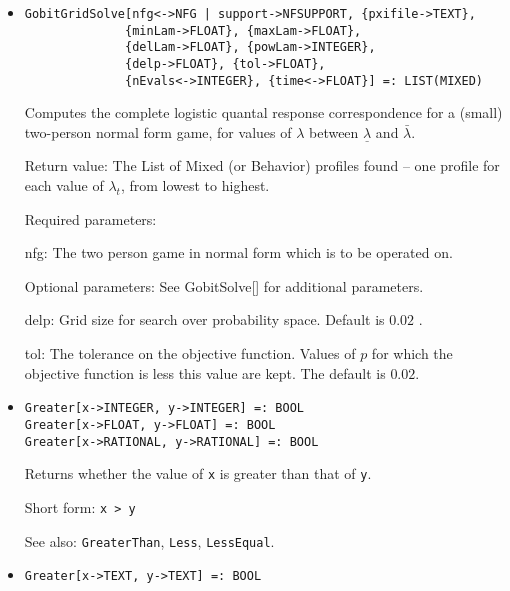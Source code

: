 \begin{itemize}
\item
\protect \large \begin{verbatim}
GobitGridSolve[nfg<->NFG | support->NFSUPPORT, {pxifile->TEXT},
              {minLam->FLOAT}, {maxLam->FLOAT}, 
              {delLam->FLOAT}, {powLam->INTEGER}, 
              {delp->FLOAT}, {tol->FLOAT},
              {nEvals<->INTEGER}, {time<->FLOAT}] =: LIST(MIXED)
\end{verbatim}\normalsize

\bd
Computes the complete logistic quantal response correspondence for a
(small) two-person normal form game, for values of $\lambda$ between
$\underline{\lambda}$ and $\bar{\lambda}.$ 

\item
[Return value:] The List of Mixed (or Behavior) profiles found -- one
profile for each value of $\lambda_t$, from lowest to highest. 

\item
[Required parameters:]\hfil\null
	
\bd
\item  
[nfg:] The two person game in normal form which is to be operated on.
\ed

\item
[Optional parameters:]  See GobitSolve[] for additional parameters.

\bd
\item
[delp:] Grid size for search over probability space.  Default is $0.02$ .
\item
[tol:] The tolerance on the objective function.  Values of $p$ for
which the objective function is less this value are kept.  The default
is $0.02$.  
\ed
\ed

\item
\protect \large \begin{verbatim}
Greater[x->INTEGER, y->INTEGER] =: BOOL
Greater[x->FLOAT, y->FLOAT] =: BOOL
Greater[x->RATIONAL, y->RATIONAL] =: BOOL
\end{verbatim}\normalsize

\bd
Returns whether the value of \verb+x+ is greater than
that of \verb+y+.
\item
[Short form:] \verb+x > y+
\item
[See also:] {\tt GreaterThan}, {\tt Less}, {\tt LessEqual}.
\ed

\item
\protect \large \begin{verbatim}
Greater[x->TEXT, y->TEXT] =: BOOL
\end{verbatim}\normalsize


\end{itemize}
